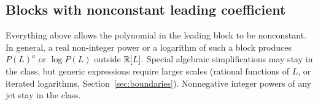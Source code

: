 \subsection{Blocks with nonconstant leading coefficient}

Everything above allows the polynomial in the leading block to be nonconstant. In general, a real non-integer power or a logarithm of such a block produces $P(L)^a$ or $\log P(L)$ outside $\mathbb R[L]$. Special algebraic simplifications may stay in the class, but generic expressions require larger scales (rational functions of $L$, or iterated logarithms, Section~\ref{sec:boundaries}). Nonnegative integer powers of any jet stay in the class.
